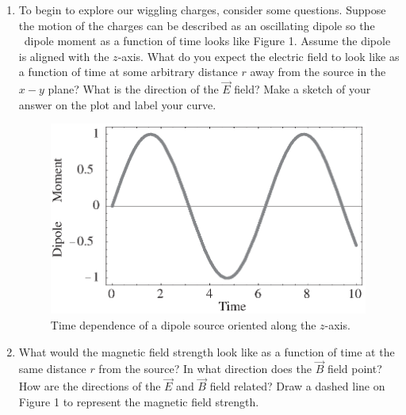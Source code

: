 \begin{enumerate}[labparts]

\item To begin to explore our wiggling charges, consider some questions.
Suppose the motion of the charges can be described as an oscillating dipole so the \
dipole moment as a function of time looks like Figure 1.
Assume the dipole is aligned with the $z$-axis.
What do you expect the electric field to look like as a function of time 
at some arbitrary distance $r$
away from the source in the $x-y$ plane?
What is the direction of the $\vec E$ field?
Make a sketch of your answer on the plot and label your curve.
\begin{figure}[hbt]
\hspace{0.375in}\includegraphics[height=2.5in]{induction_intro/fig1_bw.eps}
\caption{Time dependence of a dipole source oriented along the $z$-axis.}
\end{figure}


\item What would the magnetic field strength look like as a function of time at the same 
distance $r$ from the source?
In what direction does the $\vec B$ field point?
How are the directions of the $\vec E$ and $\vec B$ field related?
Draw a dashed line on Figure 1 to represent the magnetic field strength.
\vspace{2.0cm}

\end{enumerate}
